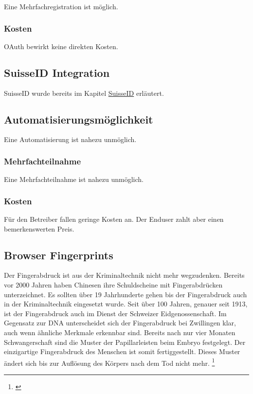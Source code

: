Eine Mehrfachregistration ist möglich.

\subsubsection{Kosten}\label{kosten-7}

OAuth bewirkt keine direkten Kosten.

\subsection{SuisseID Integration}\label{suisseid-integration}

SuisseID wurde bereits im Kapitel \protect\hyperlink{suisseid}{SuisseID}
erläutert.

\subsection{Automatisierungsmöglichkeit}\label{automatisierungsmuxf6glichkeit-7}

Eine Automatisierung ist nahezu unmöglich.

\subsubsection{Mehrfachteilnahme}\label{mehrfachteilnahme-6}

Eine Mehrfachteilnahme ist nahezu unmöglich.

\subsubsection{Kosten}\label{kosten-8}

Für den Betreiber fallen geringe Kosten an. Der Enduser zahlt aber einen
bemerkenswerten Preis.

\subsection{Browser Fingerprints}\label{browser-fingerprints}

Der Fingerabdruck ist aus der Kriminaltechnik nicht mehr wegzudenken.
Bereits vor 2000 Jahren haben Chinesen ihre Schuldscheine mit
Fingerabdrücken unterzeichnet. Es sollten über 19 Jahrhunderte gehen bis
der Fingerabdruck auch in der Kriminaltechnik eingesetzt wurde. Seit
über 100 Jahren, genauer seit 1913, ist der Fingerabdruck auch im Dienst
der Schweizer Eidgenossenschaft. Im Gegensatz zur DNA unterscheidet sich
der Fingerabdruck bei Zwillingen klar, auch wenn ähnliche Merkmale
erkennbar sind. Bereits nach nur vier Monaten Schwangerschaft sind die
Muster der Papillarleisten beim Embryo festgelegt. Der einzigartige
Fingerabdruck des Menschen ist somit fertiggestellt. Dieses Muster
ändert sich bis zur Auflösung des Körpers nach dem Tod nicht mehr.
\footnote{\autocite{derfingerabdruck}}


